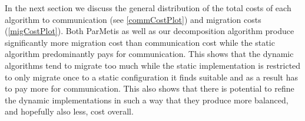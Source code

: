 \documentclass[a4paper,xcolor=dvipsnames, tikz, 12pt]{article}
\newcommand{\nl}{\newline}
\theoremstyle{definition}
\begin{document}
In the next section we discuss the general distribution of the total costs of each algorithm to communication (see \cref{commCostPlot}) and migration costs (\cref{migCostPlot}).\nl
Both ParMetis as well as our decomposition algorithm produce significantly more migration cost than communication cost while the static algorithm predominantly pays for communication. This shows that the dynamic algorithms tend to migrate too much while the static implementation is restricted to only migrate once to a static configuration it finds suitable and as a result has to pay more for communication. This also shows that there is potential to refine the dynamic implementations in such a way that they produce more balanced, and hopefully also less, cost overall.

\clearpage %

                             

	
\end{document}
